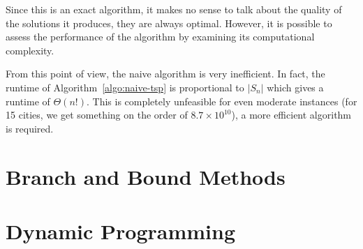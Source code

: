 Since this is an exact algorithm, it makes no sense to talk about the quality of the solutions it produces, they are always optimal. However, it is possible to assess the performance of the algorithm by examining its computational complexity.

From this point of view, the naive algorithm is very inefficient. In fact, the runtime of Algorithm~\ref{algo:naive-tsp} is proportional to \(|S_n|\) which gives a runtime of \(\Theta(n!)\). This is completely unfeasible for even moderate instances (for 15 cities, we get something on the order of \(8.7 \times 10^{10}\)), a more efficient algorithm is required.


\section{Branch and Bound Methods}



\section{Dynamic Programming}